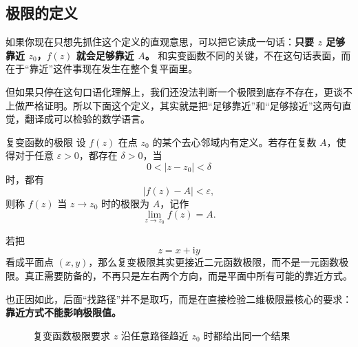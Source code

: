 \subsection{极限的定义}

如果你现在只想先抓住这个定义的直观意思，可以把它读成一句话：\textbf{只要 $z$ 足够靠近 $z_0$，$f(z)$ 就会足够靠近 $A$。} 和实变函数不同的关键，不在这句话表面，而在于``靠近''这件事现在发生在整个复平面里。

但如果只停在这句口语化理解上，我们还没法判断一个极限到底存不存在，更谈不上做严格证明。所以下面这个定义，其实就是把``足够靠近''和``足够接近''这两句直觉，翻译成可以检验的数学语言。

\begin{dingliyi}{复变函数的极限}{}
设 $f(z)$ 在点 $z_0$ 的某个去心邻域内有定义。若存在复数 $A$，使得对于任意 $\varepsilon>0$，都存在 $\delta>0$，当
\begin{equation}
    0<|z-z_0|<\delta
\end{equation}
时，都有
\begin{equation}
    |f(z)-A|<\varepsilon,
\end{equation}
则称 $f(z)$ 当 $z\to z_0$ 时的极限为 $A$，记作
\begin{equation}
    \lim_{z\to z_0}f(z)=A.
\end{equation}
\end{dingliyi}

\begin{tishi}[这一定义更像哪一章高等数学]
若把
\[
    z=x+\mathrm{i}y
\]
看成平面点 $(x,y)$，那么复变极限其实更接近二元函数极限，而不是一元函数极限。真正需要防备的，不再只是左右两个方向，而是平面中所有可能的靠近方式。

也正因如此，后面``找路径''并不是取巧，而是在直接检验二维极限最核心的要求：\textbf{靠近方式不能影响极限值。}
\end{tishi}

\begin{figure}[htbp]
\centering
{}
\caption{复变函数极限要求 $z$ 沿任意路径趋近 $z_0$ 时都给出同一个结果}
\label{fig:ch02-limit-paths}
\end{figure}

